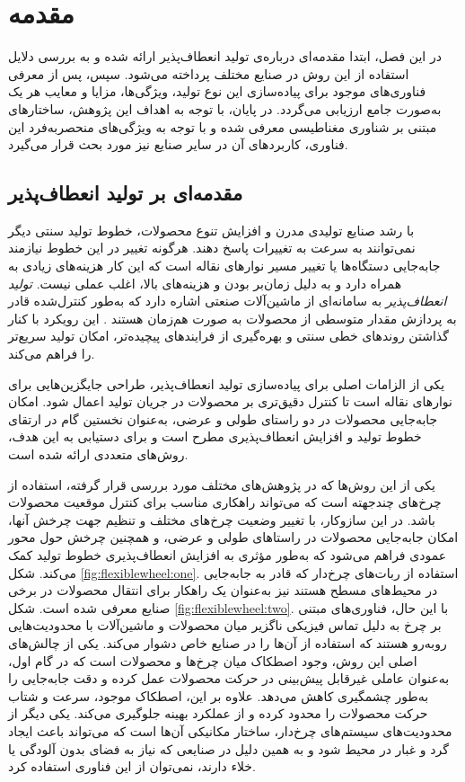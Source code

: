
\chapter{مقدمه}
در این فصل، ابتدا مقدمه‌ای درباره‌ی تولید انعطاف‌پذیر ارائه شده و به بررسی دلایل استفاده از این روش در صنایع مختلف پرداخته می‌شود. سپس، پس از معرفی فناوری‌های موجود برای پیاده‌سازی این نوع تولید، ویژگی‌ها، مزایا و معایب هر یک به‌صورت جامع ارزیابی می‌گردد. در پایان، با توجه به اهداف این پژوهش، ساختارهای مبتنی بر شناوری مغناطیسی معرفی شده و با توجه به ویژگی‌های منحصربه‌فرد این فناوری، کاربردهای آن در سایر صنایع نیز مورد بحث قرار می‌گیرد.

\section{مقدمه‌ای بر تولید انعطاف‌پذیر}

با رشد صنایع تولیدی مدرن و افزایش تنوع محصولات، خطوط تولید سنتی دیگر نمی‌توانند به سرعت به تغییرات پاسخ دهند. هرگونه تغییر در این خطوط نیازمند جابه‌جایی دستگاه‌ها یا تغییر مسیر نوارهای نقاله است که این کار هزینه‌های زیادی به همراه دارد و به دلیل زمان‌بر بودن و هزینه‌های بالا، اغلب عملی نیست.
\textit{تولید انعطاف‌پذیر} 
به سامانه‌ای از ماشین‌آلات صنعتی اشاره دارد که به‌طور کنترل‌شده قادر به پردازش مقدار متوسطی از محصولات به صورت هم‌زمان هستند
\cite{browne1984classification}.
 این رویکرد با کنار گذاشتن روندهای خطی سنتی و بهره‌گیری از فرایندهای پیچیده‌تر، امکان تولید سریع‌تر را فراهم می‌کند.

یکی از الزامات اصلی برای پیاده‌سازی تولید انعطاف‌پذیر، طراحی جایگزین‌هایی برای نوارهای نقاله است تا کنترل دقیق‌تری بر محصولات در جریان تولید اعمال شود. امکان جابه‌جایی محصولات در دو راستای طولی و عرضی، به‌عنوان نخستین گام در ارتقای خطوط تولید و افزایش انعطاف‌پذیری مطرح است و برای دستیابی به این هدف، روش‌های متعددی ارائه شده است.

یکی از این روش‌ها که در پژوهش‌های مختلف مورد بررسی قرار گرفته، استفاده از چرخ‌های چندجهته است که می‌تواند راهکاری مناسب برای کنترل موقعیت محصولات باشد. در این سازوکار، با تغییر وضعیت چرخ‌های مختلف و تنظیم جهت چرخش آنها، امکان جابه‌جایی محصولات در راستاهای طولی و عرضی، و همچنین چرخش حول محور عمودی فراهم می‌شود که به‌طور مؤثری به افزایش انعطاف‌پذیری خطوط تولید کمک می‌کند.
شکل \ref{fig:flexiblewheel:one}. 
استفاده از ربات‌های چرخ‌دار که قادر به جابه‌جایی در محیط‌های مسطح هستند نیز به‌عنوان یک راهکار برای انتقال محصولات در برخی صنایع معرفی شده است. 
شکل \ref{fig:flexiblewheel:two}.  
با این‌ حال، فناوری‌های مبتنی‌ بر چرخ به‌ دلیل تماس فیزیکی ناگزیر میان محصولات و ماشین‌آلات با محدودیت‌هایی روبه‌رو هستند که استفاده از آن‌ها را در صنایع خاص دشوار می‌کند. یکی از چالش‌های اصلی این روش، وجود اصطکاک میان چرخ‌ها و محصولات است که در گام اول، به‌عنوان عاملی غیرقابل‌ پیش‌بینی در حرکت محصولات عمل کرده و دقت جابه‌جایی را به‌طور چشمگیری کاهش می‌دهد. علاوه‌ بر این، اصطکاک موجود، سرعت و شتاب حرکت محصولات را محدود کرده و از عملکرد بهینه جلوگیری می‌کند.
یکی دیگر از محدودیت‌های سیستم‌های چرخ‌دار، ساختار مکانیکی آن‌ها است که می‌تواند باعث ایجاد گرد و غبار در محیط شود و به همین دلیل در صنایعی که نیاز به فضای بدون آلودگی یا خلاء دارند، نمی‌توان از این فناوری استفاده کرد.

